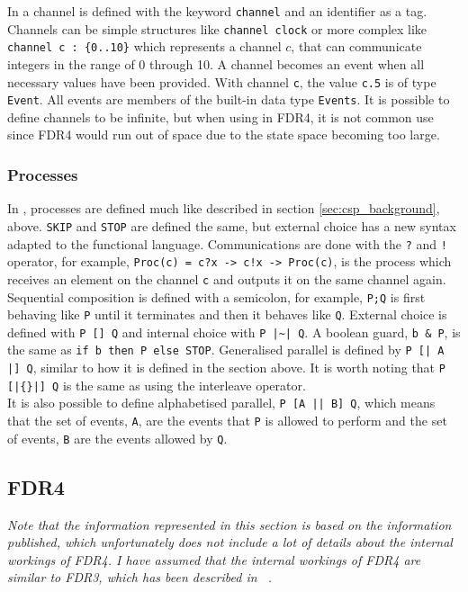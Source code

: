 In \cspm{} a channel is defined with the keyword \texttt{channel} and an identifier as a tag. Channels can be simple structures like \texttt{channel clock} or more complex like \texttt{channel c : \{0..10\}} which represents a channel $c$, that can communicate integers in the range of 0 through 10. A channel becomes an event when all necessary values have been provided. With channel \texttt{c}, the value \texttt{c.5} is of type \texttt{Event}. All events are members of the built-in data type \texttt{Events}. It is possible to define channels to be infinite, but when using \cspm{} in FDR4, it is not common use since FDR4 would run out of space due to the state space becoming too large.
\subsubsection{\cspm{} Processes}
In \cspm{}, processes are defined much like described in section \ref{sec:csp_background}, above. \texttt{SKIP} and \texttt{STOP} are defined the same, but external choice has a new syntax adapted to the functional language. Communications are done with the \texttt{?} and \texttt{!} operator, for example, \texttt{Proc(c) = c?x -> c!x -> Proc(c)}, is the process which receives an element on the channel \texttt{c} and outputs it on the same channel again.
Sequential composition is defined with a semicolon, for example, \texttt{P;Q} is first behaving like \texttt{P} until it terminates and then it behaves like \texttt{Q}.
External choice is defined with \texttt{P [] Q} and internal choice with \texttt{P |\textasciitilde| Q}. A boolean guard, \texttt{b \& P}, is the same as \texttt{if b then P else STOP}.
Generalised parallel is defined by \texttt{P [| A |] Q}, similar to how it is defined in the section above. It is worth noting that \texttt{P [|\{\}|] Q} is the same as using the interleave operator. \\
It is also possible to define alphabetised parallel, \texttt{P [A || B] Q}, which means that the set of events, \texttt{A}, are the events that \texttt{P} is allowed to perform and the set of events, \texttt{B} are the events allowed by \texttt{Q}.
\subsection{FDR4}
\label{sec:background_fdr}
\textit{Note that the information represented in this section is based on the information published, which unfortunately does not include a lot of details about the internal workings of FDR4. I have assumed that the internal workings of FDR4 are similar to FDR3, which has been described in ~\cite{fdr}.}\\

